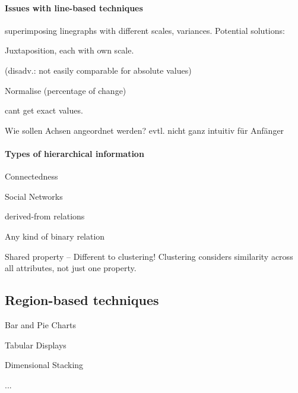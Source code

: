 \documentclass[10pt]{article} %
\begin{document}
\paragraph{Issues with line-based techniques}
\begin{cptitemize} 
  	 \item superimposing linegraphs with different scales, variances.
  	 Potential solutions: 
  	 \begin{cptitemize} 
  	  	 \item Juxtaposition, each with own scale. 
  	 		\begin{cptitemize} 
  	 		 	 \disadvantageit (disadv.: not easily comparable for absolute values) 
  	 		\end{cptitemize} 
  	 		\item Normalise (percentage of change)
  	 		\begin{cptitemize} 
  	 		 	 \disadvantageit cant get exact values. 
  	 		\end{cptitemize} 
  	 \end{cptitemize} 
 \end{cptitemize}  

\begin{definition}
  \begin{cptitemize}
    \disadvantageit Wie sollen Achsen angeordnet werden?
    \disadvantageit evtl. nicht ganz intuitiv für Anfänger
  \end{cptitemize}
\end{definition}


\paragraph{Types of hierarchical information}
\begin{cptitemize}
\item Connectedness
\item Social Networks
\item derived-from relations
\item Any kind of binary relation
  \item Shared property -- Different to clustering! Clustering considers similarity across all attributes, not just one property.
\end{cptitemize}

\subsection{Region-based techniques}
\begin{cptitemize}
\item Bar and Pie Charts
\item Tabular Displays
\item Dimensional Stacking
\item ...
\end{cptitemize}
\end{document}
